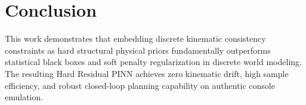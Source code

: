 \documentclass[10pt,twocolumn,letterpaper]{article}
\begin{document}
\section{Conclusion}
This work demonstrates that embedding discrete kinematic consistency constraints as hard structural physical priors fundamentally outperforms statistical black boxes and soft penalty regularization in discrete world modeling. The resulting Hard Residual PINN achieves zero kinematic drift, high sample efficiency, and robust closed-loop planning capability on authentic console emulation.



\end{document}
